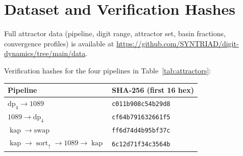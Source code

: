 \documentclass[11pt,a4paper]{amsart}
\theoremstyle{plain}
\theoremstyle{definition}
\theoremstyle{remark}
\DeclareMathOperator{\sort}{sort}
\DeclareMathOperator{\kap}{kap}
\begin{document}
\section{Dataset and Verification Hashes}\label{app:data}

Full attractor data (pipeline, digit range, attractor set, basin fractions,
convergence profiles) is available at
\url{https://github.com/SYNTRIAD/digit-dynamics/tree/main/data}.

Verification hashes for the four pipelines in Table~\ref{tab:attractors}:

\begin{center}
\footnotesize
\begin{tabular}{@{}ll@{}}
\toprule
Pipeline & SHA-256 (first 16 hex) \\
\midrule
$\text{dp}_4 \to \text{1089}$ & \texttt{c011b908c54b29d8} \\
$\text{1089} \to \text{dp}_4$ & \texttt{cf64b791632661f5} \\
$\kap \to \text{swap}$ & \texttt{ff6d74d4b95bf37c} \\
$\kap \to \sort_\uparrow \to \text{1089} \to \kap$ & \texttt{6c12d71f34c3564b} \\
\bottomrule
\end{tabular}
\end{center}
\end{document}
